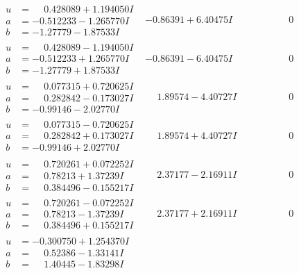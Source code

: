 \documentclass[1p]{elsarticle_modified}
\theoremstyle{definition}
\begin{document}
$$\begin{array}{c|c|c}
\begin{aligned}
u &= \phantom{-}0.428089 + 1.194050 I \\
a &= -0.512233 - 1.265770 I \\
b &= -1.27779 - 1.87533 I\end{aligned}
 & -0.86391 + 6.40475 I & \phantom{-0.000000 } 0 \\ \hline\begin{aligned}
u &= \phantom{-}0.428089 - 1.194050 I \\
a &= -0.512233 + 1.265770 I \\
b &= -1.27779 + 1.87533 I\end{aligned}
 & -0.86391 - 6.40475 I & \phantom{-0.000000 } 0 \\ \hline\begin{aligned}
u &= \phantom{-}0.077315 + 0.720625 I \\
a &= \phantom{-}0.282842 - 0.173027 I \\
b &= -0.99146 - 2.02770 I\end{aligned}
 & \phantom{-}1.89574 - 4.40727 I & \phantom{-0.000000 } 0 \\ \hline\begin{aligned}
u &= \phantom{-}0.077315 - 0.720625 I \\
a &= \phantom{-}0.282842 + 0.173027 I \\
b &= -0.99146 + 2.02770 I\end{aligned}
 & \phantom{-}1.89574 + 4.40727 I & \phantom{-0.000000 } 0 \\ \hline\begin{aligned}
u &= \phantom{-}0.720261 + 0.072252 I \\
a &= \phantom{-}0.78213 + 1.37239 I \\
b &= \phantom{-}0.384496 - 0.155217 I\end{aligned}
 & \phantom{-}2.37177 - 2.16911 I & \phantom{-0.000000 } 0 \\ \hline\begin{aligned}
u &= \phantom{-}0.720261 - 0.072252 I \\
a &= \phantom{-}0.78213 - 1.37239 I \\
b &= \phantom{-}0.384496 + 0.155217 I\end{aligned}
 & \phantom{-}2.37177 + 2.16911 I & \phantom{-0.000000 } 0 \\ \hline\begin{aligned}
u &= -0.300750 + 1.254370 I \\
a &= \phantom{-}0.52386 - 1.33141 I \\
b &= \phantom{-}1.40445 - 1.83298 I\end{aligned}

\end{array}$$
\end{document}
